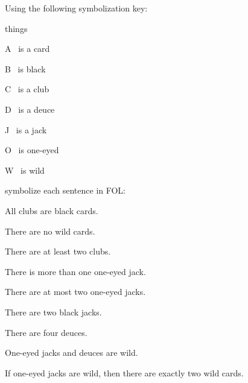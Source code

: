 \problempart
\label{pr.FOLcards}
Using the following symbolization key:
\begin{ekey}
\item[\text{domain}] things
\item[A] \blank\ is a card
\item[B] \blank\  is black
\item[C] \blank\  is a club
\item[D] \blank\  is a deuce
\item[J] \blank\  is a jack
\item[O] \blank\  is one-eyed
\item[W] \blank\  is wild
\end{ekey}
symbolize each sentence in FOL:
\begin{earg}
\item All clubs are black cards.
\item There are no wild cards.
\item There are at least two clubs.
\item There is more than one one-eyed jack.
\item There are at most two one-eyed jacks.
\item There are two black jacks.
\item There are four deuces.
\item One-eyed jacks and deuces are wild.
\item If one-eyed jacks are wild, then there are exactly two wild cards.
\end{earg}

\

